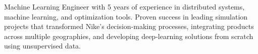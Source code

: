 


\begin{cvparagraph}
Machine Learning Engineer with 5 years of experience in distributed systems, machine learning, and optimization tools. Proven success in leading simulation projects that transformed Nike’s decision-making processes, integrating products across multiple geographies, and developing deep-learning solutions from scratch using unsupervised data.
\end{cvparagraph}
